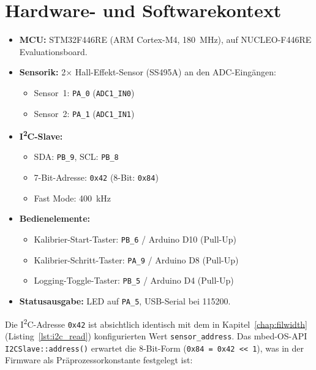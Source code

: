 \section{Hardware- und Softwarekontext}


\begin{itemize}
  \item \textbf{MCU:} STM32F446RE (ARM Cortex-M4, \qty{180}{\mega\hertz}), auf NUCLEO-F446RE Evaluationsboard.
  \item \textbf{Sensorik:} 2$\times$ Hall-Effekt-Sensor (SS495A) an den ADC-Eingängen:
    \begin{itemize}
      \item Sensor~1: \texttt{PA\_0} (\texttt{ADC1\_IN0})
      \item Sensor~2: \texttt{PA\_1} (\texttt{ADC1\_IN1})
    \end{itemize}
  \item \textbf{I\textsuperscript{2}C-Slave:}
    \begin{itemize}
      \item SDA: \texttt{PB\_9}, SCL: \texttt{PB\_8}
      \item 7-Bit-Adresse: \texttt{0x42} (8-Bit: \texttt{0x84})
      \item Fast Mode: \qty{400}{\kilo\hertz}
    \end{itemize}
  \item \textbf{Bedienelemente:}
    \begin{itemize}
      \item Kalibrier-Start-Taster: \texttt{PB\_6} / Arduino D10 (Pull-Up)
      \item Kalibrier-Schritt-Taster: \texttt{PA\_9} / Arduino D8 (Pull-Up)
      \item Logging-Toggle-Taster: \texttt{PB\_5} / Arduino D4 (Pull-Up)
    \end{itemize}
  \item \textbf{Statusausgabe:} LED auf \texttt{PA\_5}, USB-Serial bei \qty{115200}{\baud}.
\end{itemize}

Die I\textsuperscript{2}C-Adresse \texttt{0x42} ist absichtlich identisch mit dem in Kapitel~\ref{chap:filwidth} (Listing~\ref{lst:i2c_read}) konfigurierten Wert \texttt{sensor\_address}.
Das mbed-OS-API \texttt{I2CSlave::address()} erwartet die 8-Bit-Form (\texttt{0x84 = 0x42 \textless\textless\ 1}), was in der Firmware als Präprozessorkonstante festgelegt ist:

